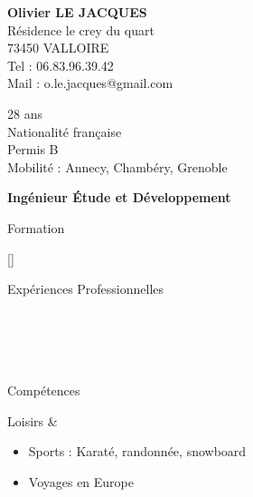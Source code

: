 \documentclass{cv}
\newlength{\espaceChamps}
\newcommand{\educationdir}{french/education}
\newcommand{\experiencedir}{french/experience}
\newcommand{\skilldir}{french/skill}
\newlength{\firstcolumnwidth}%
\begin{document}
\begin{chapeau}
	\begin{adresse}
		\textbf{Olivier LE JACQUES}\\
		Résidence le crey du quart\\
		73450 VALLOIRE\\
		Tel : 06.83.96.39.42\\
		Mail : o.le.jacques@gmail.com\\
	\end{adresse}
	\begin{etatcivil}
		28 ans \\
        Nationalité française \\
		Permis B \\
        Mobilité : Annecy, Chambéry, Grenoble \\
	\end{etatcivil}
\end{chapeau}

\vspace{0.2cm}

\begin{center}
	\textbf{\huge{Ingénieur Étude et Développement}}
\end{center}

\vspace{0.2cm}

\begin{rubriquetableau}[\firstcolumnwidth]{Formation}
    
    
    
    
    
    [\espaceChamps] \\
\end{rubriquetableau}

\begin{rubriquetableau}[\firstcolumnwidth]{Expériences Professionnelles}
     \\
	 \\
	 \\
	 \\
	 \\
\end{rubriquetableau}

\newpage

\begin{rubriquetableau}[\firstcolumnwidth]{Compétences}
    
	
	
\end{rubriquetableau}
    
\begin{rubriquetableau}[\firstcolumnwidth]{Loisirs}
	& \begin{itemize}
		\item Sports : Karaté, randonnée, snowboard
        \item Voyages en Europe
	\end{itemize}\\
\end{rubriquetableau}
\end{document}
